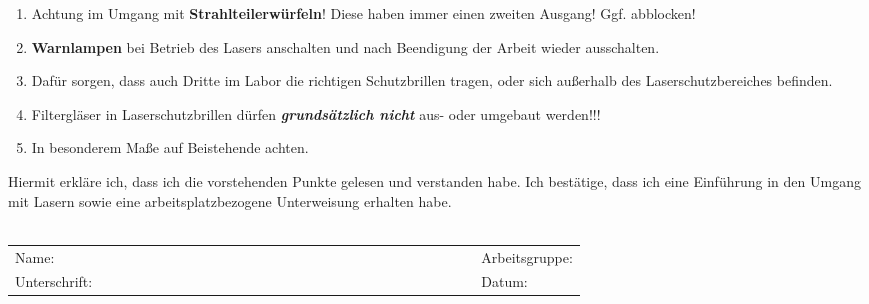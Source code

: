 \documentclass[
class=book,
accentcolor=1b,
custommargins=geometry,
fontsize=11pt,
thesis={type=Versuchsanleitung},
ruledheaders=all,
headline=false,
instbox=false,
marginpar=false,
title=small,
ignore-missing-data=true,
twoside=false,
logofile=apqdesign/tuda_logo.pdf,
pdfa=false %
]{apqpub}
\begin{document}
\begin{enumerate}
\vspace{-2pt}
\item Achtung im Umgang mit \textbf{Strahlteilerwürfeln}! Diese haben immer einen zweiten Ausgang! Ggf. abblocken!
\vspace{-2pt}
\item \textbf{Warnlampen} bei Betrieb des Lasers anschalten und nach Beendigung der Arbeit wieder ausschalten.
\vspace{-2pt}
\item Dafür sorgen, dass auch Dritte im Labor die richtigen Schutzbrillen tragen, oder sich außerhalb des Laserschutzbereiches befinden.
\vspace{-2pt}
\item Filtergläser in Laserschutzbrillen dürfen \textbf{\textit{grundsätzlich nicht}} aus- oder umgebaut
werden!!!
\vspace{-2pt}
\item In besonderem Maße auf Beistehende achten.
\end{enumerate}
Hiermit erkläre ich, dass ich die vorstehenden Punkte gelesen und verstanden habe. Ich bestätige, dass ich eine Einführung in den Umgang mit Lasern sowie eine arbeitsplatzbezogene Unterweisung erhalten habe.\\

~~\\

\begin{tabular}{ll}
 Name:~~~~~~~~~~~~~~~~~~~~~~~~~~~~~~~~~~~~~~~~~~~~~~~~~~~~~~~~~~~ & Arbeitsgruppe:\\
    Unterschrift: & Datum:
\end{tabular}	
\end{document}
